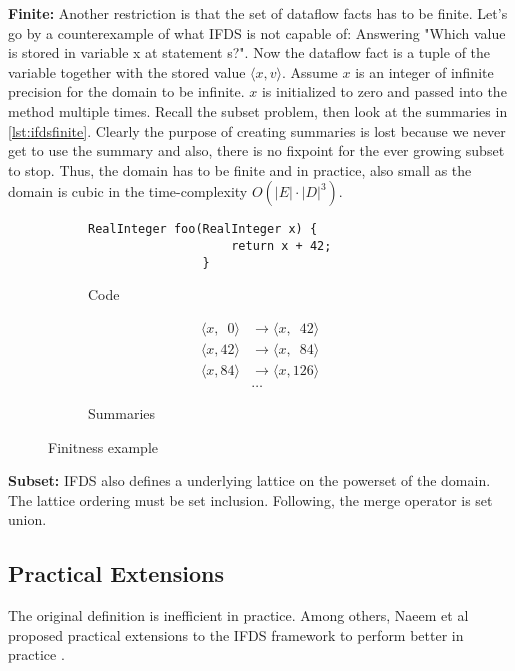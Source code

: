 \documentclass[../draft.tex]{subfiles}
\begin{document}
    \textbf{Finite:} Another restriction is that the set of dataflow facts has to be finite. Let's go by a counterexample of what IFDS is not capable of: Answering "Which value is stored in variable x at statement s?".
    Now the dataflow fact is a tuple of the variable together with the stored value $\langle x, v \rangle$. Assume $x$ is an integer of infinite precision for the domain to be infinite.
    $x$ is initialized to zero and passed into the method  multiple times. Recall the subset problem, then look at the summaries in \autoref{lst:ifdsfinite}. Clearly the purpose of creating summaries is lost because we never get to use the summary and also, there is no fixpoint for the ever growing subset to stop. Thus, the domain has to be finite and in practice, also small as the domain is cubic in the time-complexity $O(|E| \cdot |D|^3)$.
    \begin{figure}[ht]
        \centering
        \begin{subfigure}[b]{0.45\textwidth}
            \begin{lstlisting}[gobble=16]
                RealInteger foo(RealInteger x) {
                    return x + 42;
                }
            \end{lstlisting}
            \caption{Code}
        \end{subfigure}
        \begin{subfigure}[b]{0.45\textwidth}
            $$
                \begin{aligned}
                    \langle x, \phantom{0}0 \rangle &\rightarrow \langle x, \phantom{1}42 \rangle\\
                    \langle x, 42 \rangle &\rightarrow \langle x, \phantom{1}84 \rangle\\
                    \langle x, 84 \rangle &\rightarrow \langle x, 126 \rangle\\
                    &\dots
                \end{aligned}
            $$
            \caption{Summaries}
        \end{subfigure}
        \caption{Finitness example}
        \label{lst:ifdsfinite}
    \end{figure}

    \textbf{Subset:} IFDS also defines a underlying lattice on the powerset of the domain. The lattice ordering must be set inclusion. Following, the merge operator is set union.
  
    \subsection{Practical Extensions}
    The original definition is inefficient in practice. Among others, Naeem et al proposed practical extensions to the IFDS framework to perform better in practice \cite{Naeem2010}.
\end{document}
